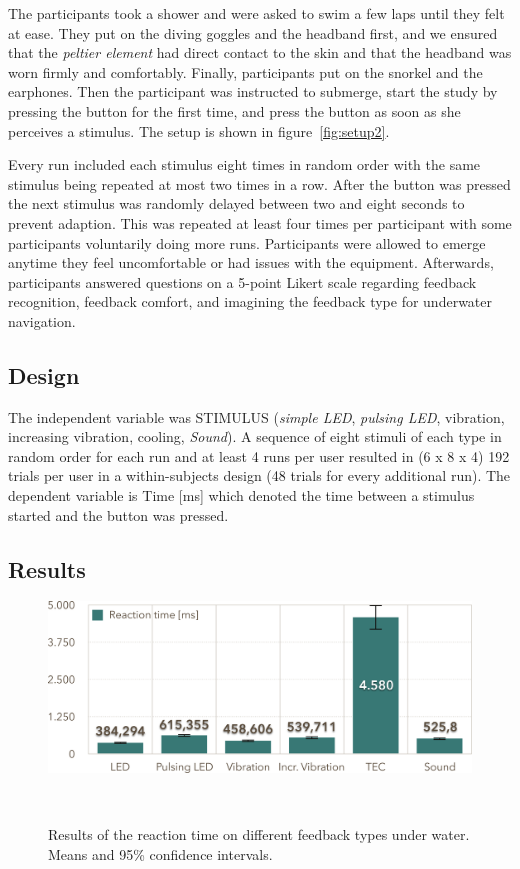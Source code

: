 The participants took a shower and were asked to swim a few laps until they felt at ease. 
They put on the diving goggles and the headband first, and we ensured that the \emph{peltier element} had direct contact to the skin and that the headband was worn firmly and comfortably. 
Finally, participants put on the snorkel and the earphones. 
Then the participant was instructed to submerge, start the study by pressing the button for the first time, and press the button as soon as she perceives a stimulus.
The setup is shown in figure~\ref{fig:setup2}. 

Every run included each stimulus eight times in random order with the same stimulus being repeated at most two times in a row. After the button was pressed the next stimulus was randomly delayed between two and eight seconds to prevent adaption. 
This was repeated at least four times per participant with some participants voluntarily doing more runs. 
Participants were allowed to emerge anytime they feel uncomfortable or had issues with the equipment. 
Afterwards, participants answered questions on a 5-point Likert scale regarding feedback recognition, feedback comfort, and imagining the feedback type for underwater navigation.

\subsection{Design}
The independent variable was STIMULUS (\emph{simple LED}, \emph{pulsing LED}, vibration, increasing vibration, cooling, \emph{Sound}). 
A sequence of eight stimuli of each type in random order for each run and at least 4 runs per user resulted in (6 x 8 x 4) 192 trials per user in a within-subjects design (48 trials for every additional run). 
The dependent variable is Time [ms] which denoted the time between a stimulus started and the button was pressed.

\subsection{Results}
\begin{figure}
	\centering
	\includegraphics[width=\columnwidth]{images/ResultsOfReactionTimes}
	\caption{Results of the reaction time on different feedback types under water. Means and 95\% confidence intervals.}~\label{fig:reactiontimes}
	\vspace{-2em}
\end{figure}

